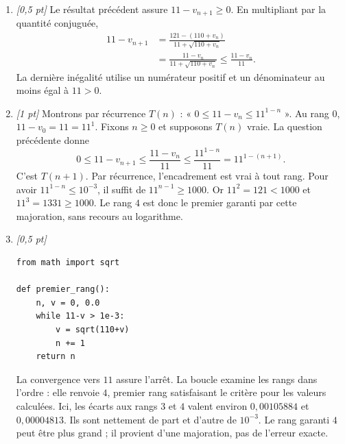 \begin{enumerate}
\item \textit{[0,5 pt]} Le résultat précédent assure $11-v_{n+1}\ge0$. En multipliant par la quantité conjuguée,
\[\begin{aligned}11-v_{n+1}&=\frac{121-(110+v_n)}{11+\sqrt{110+v_n}}\\&=\frac{11-v_n}{11+\sqrt{110+v_n}}\le\frac{11-v_n}{11}.\end{aligned}\]
La dernière inégalité utilise un numérateur positif et un dénominateur au moins égal à $11>0$.

\item \textit{[1 pt]} Montrons par récurrence $T(n)$ : « $0\le 11-v_n\le 11^{1-n}$ ».
Au rang $0$, $11-v_0=11=11^1$. Fixons $n\ge0$ et supposons $T(n)$ vraie. La question précédente donne
\[0\le 11-v_{n+1}\le\frac{11-v_n}{11}\le\frac{11^{1-n}}{11}=11^{1-(n+1)}.\]
C'est $T(n+1)$. Par récurrence, l'encadrement est vrai à tout rang.
Pour avoir $11^{1-n}\le10^{-3}$, il suffit de $11^{n-1}\ge1000$.
Or $11^{2}=121<1000$ et $11^{3}=1331\ge1000$. Le rang $4$ est donc le premier garanti par cette majoration, sans recours au logarithme.


\item \textit{[0,5 pt]} 
\begin{lstlisting}
from math import sqrt

def premier_rang():
    n, v = 0, 0.0
    while 11-v > 1e-3:
        v = sqrt(110+v)
        n += 1
    return n
\end{lstlisting}
La convergence vers $11$ assure l'arrêt. La boucle examine les rangs dans l'ordre : elle renvoie $4$, premier rang satisfaisant le critère pour les valeurs calculées. Ici, les écarts aux rangs $3$ et $4$ valent environ $0{,}00105884$ et $0{,}00004813$. Ils sont nettement de part et d'autre de $10^{-3}$. Le rang garanti $4$ peut être plus grand ; il provient d'une majoration, pas de l'erreur exacte.

\end{enumerate}

